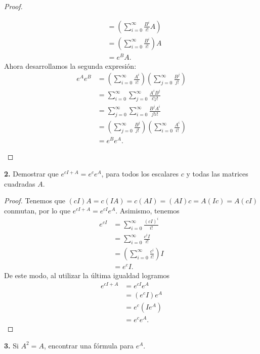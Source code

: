 \documentclass{article}
\newenvironment{statement}[1]{\smallskip\noindent\color[rgb]{1.00,0.00,0.50} {\bf #1.}}{}
\theoremstyle{definition}
\theoremstyle{remark}
\begin{document}
\begin{proof}
\begin{enumerate}
\begin{align*}
        &= \left(\sum_{i = 0}^{\infty} \frac{B^i}{i!} A\right)\\
        &= \left(\sum_{i = 0}^{\infty} \frac{B^i}{i!}\right) A\\
        &= e^B A.
      \end{align*}
      Ahora desarrollamos la segunda expresi\'on:
      \begin{align*}
        e^A e^B &= \left(\sum_{i = 0}^{\infty} \frac{A^i}{i!}\right)\left(\sum_{j = 0}^{\infty} \frac{B^j}{j!}\right)\\
        &= \sum_{i = 0}^{\infty} \sum_{j = 0}^{\infty} \frac{A^i B^j}{i! j!}\\
        &= \sum_{j = 0}^{\infty} \sum_{i = 0}^{\infty} \frac{B^j A^i}{j! i!}\\
        &= \left(\sum_{j = 0}^{\infty} \frac{B^j}{j!}\right)\left(\sum_{i = 0}^{\infty} \frac{A^i}{i!}\right)\\
        &= e^B e^A.
      \end{align*}
  \end{enumerate}
\end{proof}

\begin{statement}{2}
  Demostrar que $e^{c I  + A} = e^c e^A$, para todos los escalares $c$ y todas las matrices cuadradas $A$.
\end{statement}

\begin{proof}
  Tenemos que $(c I) A = c (I A) = c (A I) = (A I) c = A (I c) = A (c I)$ conmutan,
  por lo que $e^{c I + A} = e^{c I} e^A$. Asimismo, tenemos
  \begin{align*}
    e^{cI} &= \sum_{i = 0}^{\infty} \frac{(c I)^i}{i!}\\
    &= \sum_{i = 0}^{\infty} \frac{c^i I}{i!}\\
    &= \left(\sum_{i = 0}^{\infty} \frac{c^i}{i!}\right) I\\
    &= e^c I.
  \end{align*}
  De este modo, al utilizar la \'ultima igualdad logramos
  \begin{align*}
    e^{c I + A} &= e^{c I} e^A\\
    &= (e^c I) e^A\\
    &= e^c (I e^A)\\
    &= e^c e^A.
  \end{align*}
\end{proof}

\begin{statement}{3}
  Si $A^2 = A$, encontrar una f\'ormula para $e^A$.
\end{statement}
\end{document}
